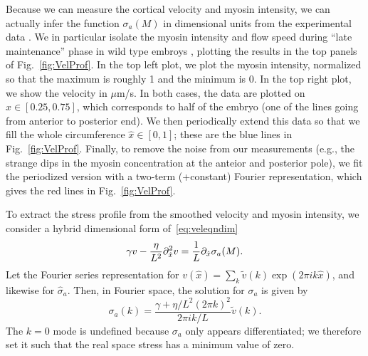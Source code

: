 \documentclass[11pt]{article}
\newcommand{\6}[1]{#1_{\text{6}}}
\newcommand{\3}[1]{#1_{\text{3}}}
\begin{document}
Because we can measure the cortical velocity and myosin intensity, we can actually infer the function $\sigma_a(M)$ in dimensional units from the experimental data \cite{sailer2015dynamic}. We in particular isolate the myosin intensity and flow speed during ``late maintenance'' phase in wild type embroys \cite[Fig.~1B(bottom)]{sailer2015dynamic}, plotting the results in the top panels of Fig.\ \ref{fig:VelProf}. In the top left plot, we plot the myosin intensity, normalized so that the maximum is roughly 1 and the minimum is 0. In the top right plot, we show the velocity in $\mu$m/s. In both cases, the data are plotted on $\hat x \in [0.25,0.75]$, which corresponds to half of the embryo (one of the lines going from anterior to posterior end). We then periodically extend this data so that we fill the whole circumference $\hat x \in [0,1]$; these are the blue lines in Fig.\ \ref{fig:VelProf}. Finally, to remove the noise from our measurements (e.g., the strange dips in the myosin concentration at the anteior and posterior pole), we fit the periodized version with a two-term (+constant) Fourier representation, which gives the red lines in Fig.\ \ref{fig:VelProf}. 

To extract the stress profile from the smoothed velocity and myosin intensity, we consider a hybrid dimensional form of\ \eqref{eq:veleqndim}
\begin{equation*}
\gamma v -\frac{ \eta}{L^2} \partial_{\hat{x}}^2 v = \frac{1}{L} \partial_{\hat{x}}  \sigma_a(M). 
\end{equation*}
Let the Fourier series representation for $v(\hat x)= \sum_k \tilde v(k) \exp{\left(2 \pi i k \hat x \right)}$, and likewise for $\hat \sigma_a$. Then, in Fourier space, the solution for $\sigma_a$ is given by 
\begin{equation}
\label{eq:SigmaAF}
\sigma_a(k) = \frac{\gamma+ \eta/L^2 \left(2 \pi k\right)^2}{2 \pi i k/L} \tilde v(k). 
\end{equation}
The $k=0$ mode is undefined because $\sigma_a$ only appears differentiated; we therefore set it such that the real space stress has a minimum value of zero. 
\end{document}
